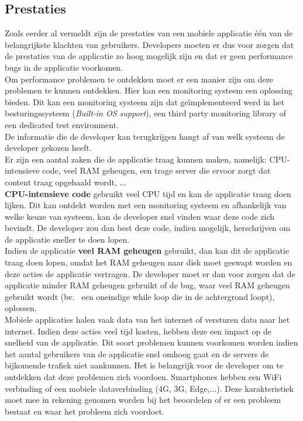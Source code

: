\subsection{Prestaties}
Zoals eerder al vermeldt zijn de prestaties van een mobiele applicatie \'e\'en van de belangrijkste klachten van gebruikers. Developers moeten er dus voor zorgen dat de prestaties van de applicatie zo hoog mogelijk zijn en dat er geen performance bugs in de applicatie voorkomen. \\

Om performance problemen te ontdekken moet er een manier zijn om deze problemen te kunnen ontdekken. Hier kan een monitoring systeem een oplossing bieden. Dit kan een monitoring systeem zijn dat ge\"implementeerd werd in het besturingssysteem (\textit{Built-in OS support}), een third party monitoring library of een dedicated test environment.  \\
De informatie die de developer kan terugkrijgen hangt af van welk systeem de developer gekozen heeft.\\

Er zijn een aantal zaken die de applicatie traag kunnen maken, namelijk: CPU-intensieve code, veel RAM geheugen,  een trage server die ervoor zorgt dat content traag opgehaald wordt, ... \\

\textbf{CPU-intensieve code} gebruikt veel CPU tijd en kan de applicatie traag doen lijken. Dit kan ontdekt worden met een monitoring systeem en afhankelijk van welke keuze van systeem, kan de developer snel vinden waar deze code zich bevindt. De developer zou dan best deze code, indien mogelijk, herschrijven om de applicatie sneller te doen lopen. \\

Indien de applicatie \textbf{veel RAM geheugen} gebruikt, dan kan dit de applicatie traag doen lopen, omdat het RAM geheugen naar disk moet geswapt worden en deze acties de applicatie vertragen. De developer moet er dan voor zorgen dat de applicatie minder RAM geheugen gebruikt of de bug, waar veel RAM geheugen gebruikt wordt (bv.~ een oneindige while loop die in de achtergrond loopt), oplossen. \\

Mobiele applicaties halen vaak data van het internet of versturen data naar het internet. Indien deze acties veel tijd kosten, hebben deze een impact op de snelheid van de applicatie. Dit soort problemen kunnen voorkomen worden indien het aantal gebruikers van de applicatie snel omhoog gaat en de servers de bijkomende trafiek niet aankunnen. Het is belangrijk voor de developer om te ontdekken dat deze problemen zich voordoen. Smartphones hebben een WiFi verbinding of een mobiele dataverbinding (4G, 3G, Edge,...). Deze karakteristiek moet mee in rekening genomen worden bij het beoordelen of er een probleem bestaat en waar het probleem zich voordoet.\\



